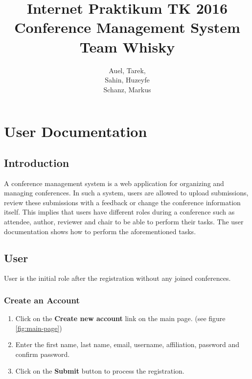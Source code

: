 \documentclass[nochapterpage,nopartpage,noheadingspace,numbersubsubsec,bigchapter,colorback,accentcolor=tud9c,10pt]{tudreport}
\title{Internet Praktikum TK 2016\\ Conference Management System\\ Team Whisky}
\subtitle{Auel, Tarek,\\ Sahin, Huzeyfe\\ Schanz, Markus}
\begin{document}
\maketitle
\tableofcontents



\part{User Documentation}
\label{part:user}

  \chapter{Introduction}
  \label{ch:user:intro}

    A conference management system is a web application for organizing and managing conferences. In such a system, users are allowed to upload submissions, review these submissions with a feedback or change the conference information itself. This implies that users have different roles during a conference such as attendee, author, reviewer and chair to be able to perform their tasks. The user documentation shows how to perform the aforementioned tasks.

  \chapter{User}

    User is the initial role after the registration without any joined conferences.

  \section{Create an Account}

        \begin{enumerate}
            \item   Click on the \textbf{Create new account} link on the main page. (see figure \ref{fig:main-page})
            \item   Enter the first name, last name, email, username, affiliation, password and confirm password.
            \item   Click on the \textbf{Submit} button to process the registration.
        \end{enumerate}
\end{document}
